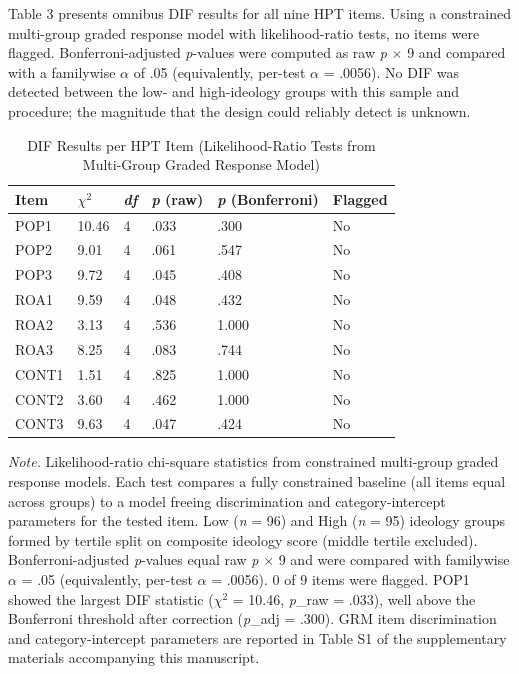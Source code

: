 \documentclass[PCJ,Unicode,screen,mode=plain]{cedram}
\begin{document}
Table 3 presents omnibus DIF results for all nine HPT items. Using a constrained multi-group graded response model with likelihood-ratio
tests, no items were flagged. Bonferroni-adjusted \emph{p}-values were computed
as raw \emph{p} \(\times\) 9 and compared with a familywise \(\alpha\) of .05
(equivalently, per-test \(\alpha\) = .0056). No DIF was detected between the low- and high-ideology groups with this sample and procedure; the magnitude that the design could reliably detect is unknown.

\begin{longtable}[]{@{}llllll@{}}
\caption{DIF Results per HPT Item (Likelihood-Ratio Tests from Multi-Group Graded Response Model)}\label{tab:3}\\
\toprule
Item & \(\chi^2\) & \emph{df} & \emph{p} (raw) & \emph{p} (Bonferroni) & Flagged \\
\midrule
\endhead
\bottomrule
\endlastfoot
POP1 & 10.46 & 4 & .033 & .300 & No \\
POP2 & 9.01 & 4 & .061 & .547 & No \\
POP3 & 9.72 & 4 & .045 & .408 & No \\
ROA1 & 9.59 & 4 & .048 & .432 & No \\
ROA2 & 3.13 & 4 & .536 & 1.000 & No \\
ROA3 & 8.25 & 4 & .083 & .744 & No \\
CONT1 & 1.51 & 4 & .825 & 1.000 & No \\
CONT2 & 3.60 & 4 & .462 & 1.000 & No \\
CONT3 & 9.63 & 4 & .047 & .424 & No \\
\end{longtable}

\emph{Note.} Likelihood-ratio chi-square statistics from constrained
multi-group graded response models. Each test compares a fully
constrained baseline (all items equal across groups) to a model
freeing discrimination and category-intercept parameters for the tested item.
Low (\emph{n} = 96) and High (\emph{n} = 95) ideology groups formed
by tertile split on composite ideology score (middle tertile
excluded). Bonferroni-adjusted \emph{p}-values equal raw \emph{p}
\(\times\) 9 and were compared with familywise \(\alpha\) = .05 (equivalently,
per-test \(\alpha\) = .0056). 0 of 9 items were flagged. POP1 showed the
largest DIF statistic (\(\chi^2\) = 10.46, \emph{p}\_raw = .033), well above
the Bonferroni threshold after correction (\emph{p}\_adj = .300). GRM item discrimination and
category-intercept parameters are reported in Table S1 of the supplementary
materials accompanying this manuscript.
\end{document}
